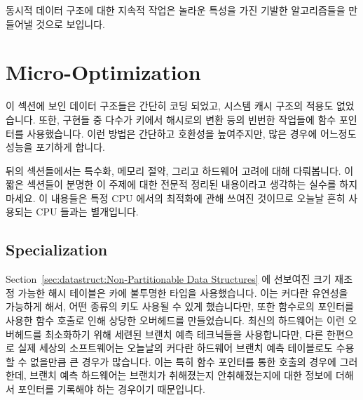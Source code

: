 동시적 데이터 구조에 대한 지속적 작업은 놀라운 특성을 가진 기발한 알고리즘들을
만들어낼 것으로 보입니다.

\section{Micro-Optimization}
\label{sec:datastruct:Micro-Optimization}

이 섹션에 보인 데이터 구조들은 간단히 코딩 되었고, 시스템 캐시 구조의 적용도
없었습니다.
또한, 구현들 중 다수가 키에서 해시로의 변환 등의 빈번한 작업들에 함수 포인터를
사용했습니다.
이런 방법은 간단하고 호환성을 높여주지만, 많은 경우에 어느정도 성능을 포기하게
합니다.

뒤의 섹션들에서는 특수화, 메모리 절약, 그리고 하드웨어 고려에 대해 다뤄봅니다.
이 짧은 섹션들이 분명한 이 주제에 대한 전문적 정리된 내용이라고 생각하는 실수를
하지 마세요.
이 내용들은 특정 CPU 에서의 최적화에 관해 쓰여진 것이므로 오늘날 흔히 사용되는
CPU 들과는 별개입니다.

\subsection{Specialization}
\label{sec:datastruct:Specialization}

Section~\ref{sec:datastruct:Non-Partitionable Data Structures}
에 선보여진 크기 재조정 가능한 해시 테이블은 카에 불투명한 타입을 사용했습니다.
이는 커다란 유연성을 가능하게 해서, 어떤 종류의 키도 사용될 수 있게 했습니다만,
또한 함수로의 포인터를 사용한 함수 호출로 인해 상당한 오버헤드를 만들었습니다.
최신의 하드웨어는 이런 오버헤드를 최소화하기 위해 세련된 브랜치 예측 테크닉들을
사용합니다만, 다른 한편으로 실제 세상의 소프트웨어는 오늘날의 커다란 하드웨어
브랜치 예측 테이블로도 수용할 수 없을만큼 큰 경우가 많습니다.
이는 특히 함수 포인터를 통한 호출의 경우에 그러한데, 브랜치 예측 하드웨어는
브랜치가 취해졌는지 안취해졌는지에 대한 정보에 더해서 포인터를 기록해야 하는
경우이기 때문입니다.
\iffalse

